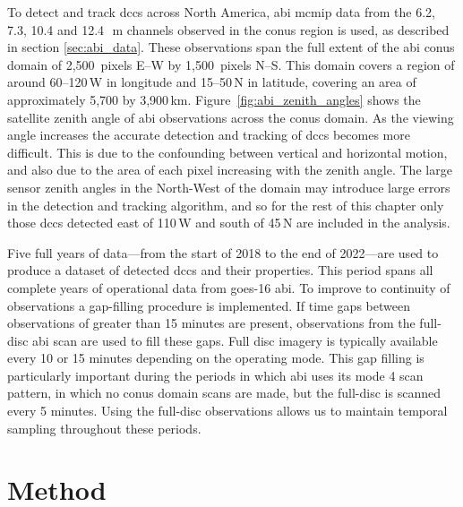 To detect and track \acrshort{dcc}s across North America, \acrshort{abi} \acrshort{mcmip} data from the 6.2, 7.3, 10.4 and 12.4\,\unit{\mu m} channels observed in the \acrshort{conus} region is used, as described in section \ref{sec:abi_data}.
These observations span the full extent of the \acrshort{abi} \acrshort{conus} domain of 2,500~pixels E--W by 1,500~pixels N--S.
This domain covers a region of around 60--120\,\textdegree W in longitude and 15--50\,\textdegree N in latitude, covering an area of approximately 5,700 by 3,900\,\unit{km}.
Figure~\ref{fig:abi_zenith_angles} shows the satellite zenith angle of \acrshort{abi} observations across the \acrshort{conus} domain.
As the viewing angle increases the accurate detection and tracking of \acrshort{dcc}s becomes more difficult.
This is due to the confounding between vertical and horizontal motion, and also due to the area of each pixel increasing with the zenith angle.
The large sensor zenith angles in the North-West of the domain may introduce large errors in the detection and tracking algorithm, and so for the rest of this chapter only those \acrshort{dcc}s detected east of 110\,\textdegree W and south of 45\,\textdegree N are included in the analysis.

Five full years of data---from the start of 2018 to the end of 2022---are used to produce a dataset of detected \acrshort{dcc}s and their properties.
This period spans all complete years of operational data from \acrshort{goes}-16 \acrshort{abi}.
To improve to continuity of observations a gap-filling procedure is implemented.
If time gaps between observations of greater than 15 minutes are present, observations from the full-disc \acrshort{abi} scan are used to fill these gaps.
Full disc imagery is typically available every 10 or 15 minutes depending on the operating mode.
This gap filling is particularly important during the periods in which \acrshort{abi} uses its mode 4 scan pattern, in which no \acrshort{conus} domain scans are made, but the full-disc is scanned every 5 minutes.
Using the full-disc observations allows us to maintain temporal sampling throughout these periods.


\section{Method} \label{sec:conus_method}


